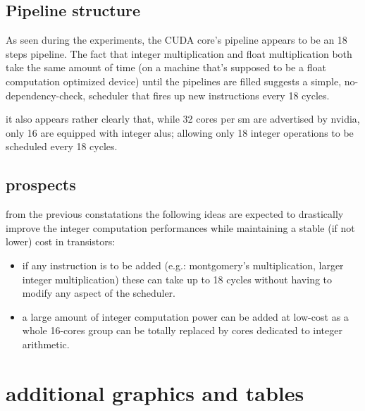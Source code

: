\documentclass{report}
\begin{document}
    \subsection{Pipeline structure}
    As seen during the experiments, the CUDA core's pipeline appears to be an
    18 steps pipeline. The fact that integer multiplication and 
    float multiplication both take the same amount
    of time (on a machine that's supposed to be a float computation
    optimized device) until the pipelines are filled suggests a simple,
    no-dependency-check, scheduler that fires up new instructions every 18 cycles.

    it also appears rather clearly that, while 32 cores per sm are advertised by
    nvidia, only 16 are equipped with integer alus; allowing only 18 integer
    operations to be scheduled every 18 cycles.
    
    \subsection{prospects}
    from the previous constatations the following ideas are expected to drastically
    improve the integer computation performances while maintaining a stable (if not
    lower) cost in transistors:
    \begin{itemize}
        \item if any instruction is to be added (e.g.: montgomery's multiplication, larger integer multiplication) these can take up to 18 cycles without having to modify any aspect of the scheduler.
        \item a large amount of integer computation power can be added at low-cost as a whole 16-cores group can be totally replaced by cores dedicated to integer arithmetic.
    \end{itemize}
\section{additional graphics and tables}
\end{document}

